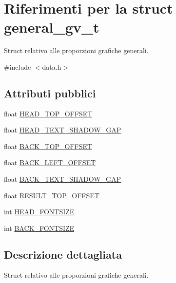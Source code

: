 \hypertarget{structgeneral__gv__t}{}\section{Riferimenti per la struct general\+\_\+gv\+\_\+t}
\label{structgeneral__gv__t}


Struct relativo alle proporzioni grafiche generali.  




{\ttfamily \#include $<$data.\+h$>$}

\subsection*{Attributi pubblici}
\begin{DoxyCompactItemize}
\item 
float \hyperlink{structgeneral__gv__t_a572bbf656ce2913288a07ce2d47c3fbe}{H\+E\+A\+D\+\_\+\+T\+O\+P\+\_\+\+O\+F\+F\+S\+ET}
\item 
float \hyperlink{structgeneral__gv__t_a99202d29316c566754e9602ef64a6875}{H\+E\+A\+D\+\_\+\+T\+E\+X\+T\+\_\+\+S\+H\+A\+D\+O\+W\+\_\+\+G\+AP}
\item 
float \hyperlink{structgeneral__gv__t_a6b15c19b5213f9cc0939caf7f7179086}{B\+A\+C\+K\+\_\+\+T\+O\+P\+\_\+\+O\+F\+F\+S\+ET}
\item 
float \hyperlink{structgeneral__gv__t_a977c6a75224caf8b71e8ce76f24a17e6}{B\+A\+C\+K\+\_\+\+L\+E\+F\+T\+\_\+\+O\+F\+F\+S\+ET}
\item 
float \hyperlink{structgeneral__gv__t_a7dcf5314af403550ee904c6fc3140703}{B\+A\+C\+K\+\_\+\+T\+E\+X\+T\+\_\+\+S\+H\+A\+D\+O\+W\+\_\+\+G\+AP}
\item 
float \hyperlink{structgeneral__gv__t_a95a0f12e648e993d277629fe2e83751e}{R\+E\+S\+U\+L\+T\+\_\+\+T\+O\+P\+\_\+\+O\+F\+F\+S\+ET}
\item 
int \hyperlink{structgeneral__gv__t_ad758522df3a3ddb6a6b6da8bc15be8aa}{H\+E\+A\+D\+\_\+\+F\+O\+N\+T\+S\+I\+ZE}
\item 
int \hyperlink{structgeneral__gv__t_a75427eccaa66bb0e209a080e5c50da66}{B\+A\+C\+K\+\_\+\+F\+O\+N\+T\+S\+I\+ZE}
\end{DoxyCompactItemize}


\subsection{Descrizione dettagliata}
Struct relativo alle proporzioni grafiche generali. 

